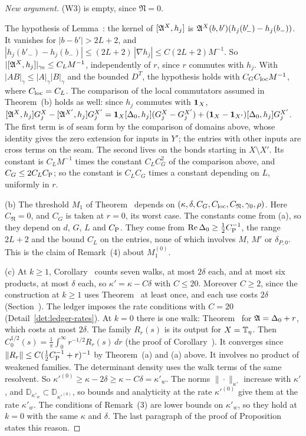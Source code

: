 \begin{proof}[New argument]
(W3) is empty, since $\mathfrak N=0$.

The hypothesis of Lemma~: the kernel of $[\mathfrak A^X,h_j]$ is $\mathfrak A^X(b,b')(h_j(b'_-)-h_j(b_-))$. It vanishes for $|b-b'|>2L+2$, and $|h_j(b'_-)-h_j(b_-)|\le(2L+2)\,|\nabla h_j|\le C(2L+2)M^{-1}$. So $|[\mathfrak A^X,h_j]|_{\gamma_0}\le C_LM^{-1}$, independently of $r$, since $r$ commutes with $h_j$. With $|AB|_{\gamma}\le|A|_\gamma|B|_\gamma$ and the bounded $D^T$, the hypothesis holds with $C_GC_{\rm loc}M^{-1}$, where $C_{\rm loc}=C_L$. The comparison of the local commutators assumed in Theorem~(b) holds as well: since $h_j$ commutes with $\mathbf 1_X$, $[\mathfrak A^X,h_j]G^X_j-[\mathfrak A^{X'},h_j]G^{X'}_j=\mathbf 1_X[\Delta_0,h_j](G^X_j-G^{X'}_j)+(\mathbf 1_X-\mathbf 1_{X'})[\Delta_0,h_j]G^{X'}_j$. The first term is of seam form by the comparison of domains above, whose identity gives the zero extension for inputs in $Y'$; the entries with other inputs are cross terms on the seam. The second lives on the bonds starting in $X\setminus X'$. Its constant is $C_LM^{-1}$ times the constant $C_LC_G^2$ of the comparison above, and $C_G\le2C_LC_{\rm P}$; so the constant is $C_LC_G$ times a constant depending on $L$, uniformly in $r$.

(b) The threshold $M_1$ of Theorem~ depends on $(\kappa,\delta,C_G,C_{\rm loc},C_{\mathfrak N},\gamma_0,\rho)$. Here $C_{\mathfrak N}=0$, and $C_G$ is taken at $r=0$, its worst case. The constants come from (a), so they depend on $d$, $G$, $L$ and $C_{\rm P}$. They come from $\operatorname{Re}\Delta_0\ge\frac12C_{\rm P}^{-1}$, the range $2L+2$ and the bound $C_L$ on the entries, none of which involves $M$, $M'$ or $\delta_{P,0}$. This is the claim of Remark~(4) about $M_1^{(0)}$.

(c) At $k\ge1$, Corollary~ counts seven walks, at most $2\delta$ each, and at most six products, at most $\delta$ each, so $\kappa'=\kappa-C\delta$ with $C\le20$. Moreover $C\ge2$, since the construction at $k\ge1$ uses Theorem~ at least once, and each use costs $2\delta$ (Section~). The ledger imposes the rate conditions with $C=20$ (Detail~\ref{det:ledger-rates}). At $k=0$ there is one walk: Theorem~ for $\mathfrak A=\Delta_0+r$, which costs at most $2\delta$. The family $R_r(s)$ is its output for $X=\mathbb T_\eta$. Then $C_0^{1/2}(s)=\frac1\pi\int_0^\infty r^{-1/2}R_r(s)\,dr$ (the proof of Corollary~). It converges since $\|R_r\|\le C(\frac12C_{\rm P}^{-1}+r)^{-1}$ by Theorem~(a) and (a) above. It involves no product of weakened families. The determinant density uses the walk terms of the same resolvent. So $\kappa'^{(0)}\ge\kappa-2\delta\ge\kappa-C\delta=\kappa'_w$. The norms $\|\cdot\|_{\kappa'}$ increase with $\kappa'$, and $\mathbb D_{\kappa'_w}\subset\mathbb D_{\kappa'^{(0)}}$, so bounds and analyticity at the rate $\kappa'^{(0)}$ give them at the rate $\kappa'_w$. The conditions of Remark~(3) are lower bounds on $\kappa'_w$, so they hold at $k=0$ with the same $\kappa$ and $\delta$. The last paragraph of the proof of Proposition~ states this reason.
\end{proof}
